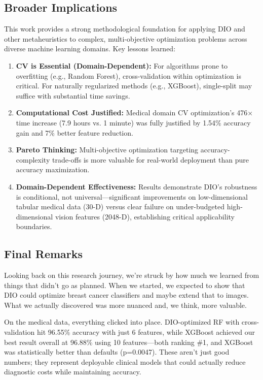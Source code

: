 \documentclass[12pt, a4paper]{article}
\begin{document}
\subsection{Broader Implications}
This work provides a strong methodological foundation for applying DIO and other metaheuristics to complex, multi-objective optimization problems across diverse machine learning domains. Key lessons learned:

\begin{enumerate}
    \item \textbf{CV is Essential (Domain-Dependent):} For algorithms prone to overfitting (e.g., Random Forest), cross-validation within optimization is critical. For naturally regularized methods (e.g., XGBoost), single-split may suffice with substantial time savings.
    \item \textbf{Computational Cost Justified:} Medical domain CV optimization's 476× time increase (7.9 hours vs. 1 minute) was fully justified by 1.54\% accuracy gain and 7\% better feature reduction.
    \item \textbf{Pareto Thinking:} Multi-objective optimization targeting accuracy-complexity trade-offs is more valuable for real-world deployment than pure accuracy maximization.
    \item \textbf{Domain-Dependent Effectiveness:} Results demonstrate DIO's robustness is conditional, not universal—significant improvements on low-dimensional tabular medical data (30-D) versus clear failure on under-budgeted high-dimensional vision features (2048-D), establishing critical applicability boundaries.
\end{enumerate}

\subsection{Final Remarks}
Looking back on this research journey, we're struck by how much we learned from things that didn't go as planned. When we started, we expected to show that DIO could optimize breast cancer classifiers and maybe extend that to images. What we actually discovered was more nuanced and, we think, more valuable.

On the medical data, everything clicked into place. DIO-optimized RF with cross-validation hit 96.55\% accuracy with just 6 features, while XGBoost achieved our best result overall at 96.88\% using 10 features—both ranking \#1, and XGBoost was statistically better than defaults (p=0.0047). These aren't just good numbers; they represent deployable clinical models that could actually reduce diagnostic costs while maintaining accuracy.
\end{document}
